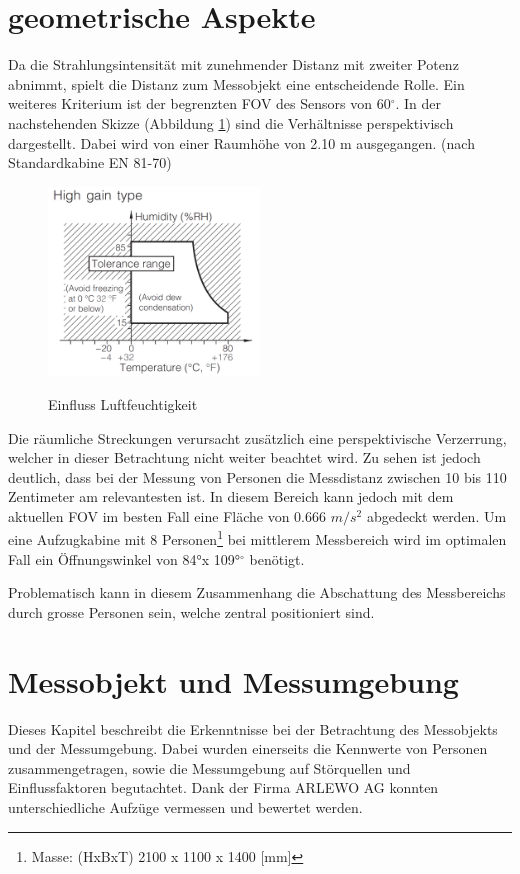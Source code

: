 \section{geometrische Aspekte}
\label{sec:geometrie}

Da die Strahlungsintensität mit zunehmender Distanz mit zweiter Potenz abnimmt, spielt die Distanz zum Messobjekt eine entscheidende Rolle. Ein weiteres Kriterium ist der begrenzten \ac{FOV} des Sensors von 60$^\circ$. In der nachstehenden Skizze (Abbildung \ref{fig:Geometrie}) sind die Verhältnisse perspektivisch dargestellt. Dabei wird von einer Raumhöhe von 2.10 m ausgegangen. (nach Standardkabine EN 81-70)   

\begin{figure}[H]
	\centering
	\includegraphics[width=0.5\textwidth]
	{fig/Humidity_Tolerance.PNG}
	\caption[Einfluss Luftfeuchtigkeit]{Einfluss Luftfeuchtigkeit} \protect\cite{AMG8834}
	\label{fig:Geometrie}
\end{figure}

Die räumliche Streckungen verursacht zusätzlich eine perspektivische Verzerrung, welcher in dieser Betrachtung nicht weiter beachtet wird. Zu sehen ist jedoch deutlich, dass bei der Messung von Personen die Messdistanz zwischen 10 bis 110 Zentimeter am relevantesten ist. In diesem Bereich kann jedoch mit dem aktuellen \ac{FOV} im besten Fall eine Fläche von 0.666 $ m/s^2 $ abgedeckt werden. Um eine Aufzugkabine mit 8 Personen\footnote[1]{Masse: (HxBxT) 2100 x 1100 x 1400 [mm]} bei mittlerem Messbereich wird im optimalen Fall ein Öffnungswinkel von 84°x 109°$^\circ$ benötigt. 

Problematisch kann in diesem Zusammenhang die Abschattung des Messbereichs durch grosse Personen sein, welche zentral positioniert sind. 

 

\section{Messobjekt und Messumgebung}
\label{sec:Messobjekt}
Dieses Kapitel beschreibt die Erkenntnisse bei der Betrachtung des Messobjekts und der Messumgebung. Dabei wurden einerseits die Kennwerte von Personen zusammengetragen, sowie die Messumgebung auf Störquellen und Einflussfaktoren begutachtet. Dank der Firma ARLEWO AG konnten unterschiedliche Aufzüge vermessen und bewertet werden. 

